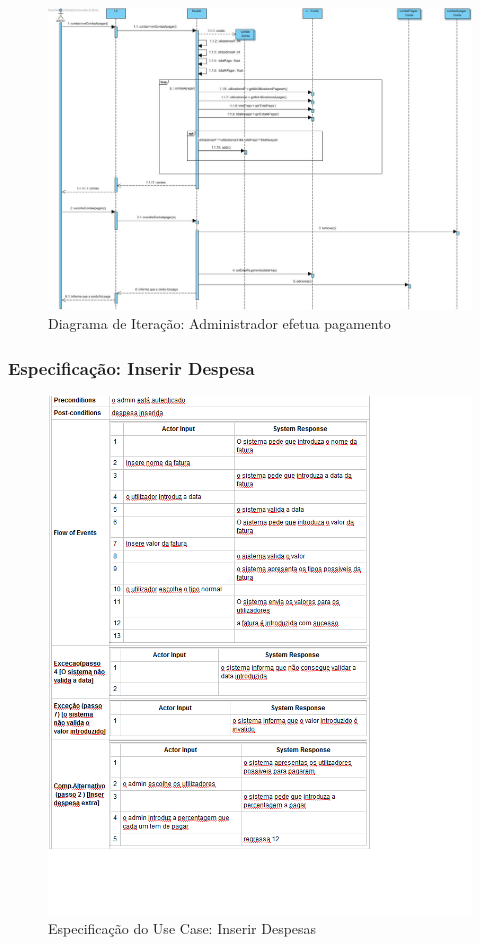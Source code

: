 \begin{figure}[htb!]
	\centering
	\includegraphics[scale=0.345]{imagens/diagramaIt/AdminPagaFactura}  
	\caption{Diagrama de Iteração: Administrador efetua pagamento }  
\end{figure}


\newpage
\subsubsection{Especificação: Inserir Despesa}
\begin{figure}[htb!]
	\centering
	\includegraphics[scale=0.8]{imagens/Especificacoes/inserirdespesas}  
	\caption{Especificação do Use Case: Inserir Despesas}  
\end{figure}

